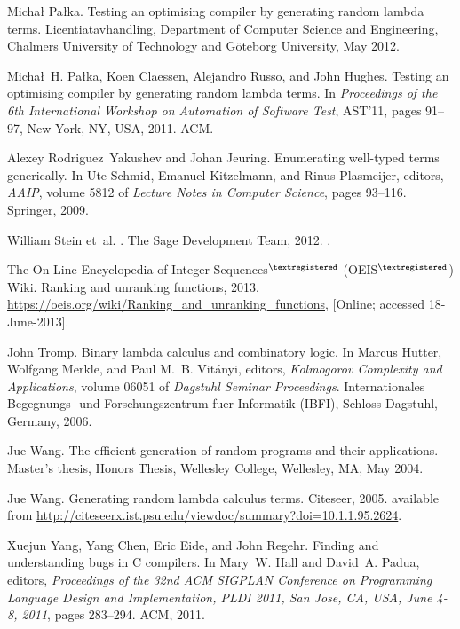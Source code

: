 \documentclass{jfp1}
\begin{document}
\begin{thebibliography}{10}
Micha{\l} Pa{\l}ka.
\newblock Testing an optimising compiler by generating random lambda terms.
\newblock Licentiatavhandling, Department of Computer Science and Engineering,
  Chalmers University of Technology and G\"oteborg University, May 2012.

Micha{\l}~H. Pa{\l}ka, Koen Claessen, Alejandro Russo, and John Hughes.
\newblock Testing an optimising compiler by generating random lambda terms.
\newblock In {\em Proceedings of the 6th International Workshop on Automation
  of Software Test}, AST'11, pages 91--97, New York, NY, USA, 2011. ACM.

Alexey {Rodriguez~Yakushev} and Johan Jeuring.
\newblock Enumerating well-typed terms generically.
\newblock In Ute Schmid, Emanuel Kitzelmann, and Rinus Plasmeijer, editors,
  {\em AAIP}, volume 5812 of {\em Lecture Notes in Computer Science}, pages
  93--116. Springer, 2009.

William Stein et~al.
.
\newblock The Sage Development Team, 2012.
.

{The On-Line Encyclopedia of Integer Sequences$^{\tiny\textregistered}$
  (OEIS$^{\tiny\textregistered}$) Wiki}.
\newblock Ranking and unranking functions, 2013.
\newblock \url{https://oeis.org/wiki/Ranking_and_unranking_functions}, [Online;
  accessed 18-June-2013].

John Tromp.
\newblock Binary lambda calculus and combinatory logic.
\newblock In Marcus Hutter, Wolfgang Merkle, and Paul M.~B. Vit{\'a}nyi,
  editors, {\em Kolmogorov Complexity and Applications}, volume 06051 of {\em
  Dagstuhl Seminar Proceedings}. Internationales Begegnungs- und
  Forschungszentrum fuer Informatik (IBFI), Schloss Dagstuhl, Germany, 2006.

Jue Wang.
\newblock The efficient generation of random programs and their applications.
\newblock Master's thesis, Honors Thesis, Wellesley College, Wellesley, MA, May
  2004.

Jue Wang.
\newblock Generating random lambda calculus terms.
\newblock Citeseer, 2005.
\newblock available from
  \url{http://citeseerx.ist.psu.edu/viewdoc/summary?doi=10.1.1.95.2624}.

Xuejun Yang, Yang Chen, Eric Eide, and John Regehr.
\newblock Finding and understanding bugs in {C} compilers.
\newblock In Mary~W. Hall and David~A. Padua, editors, {\em Proceedings of the
  32nd {ACM SIGPLAN} {Conference on Programming Language Design and
  Implementation}, {PLDI} 2011, {San Jose, CA, USA, June 4-8}, 2011}, pages
  283--294. ACM, 2011.

\end{thebibliography}
\end{document}
